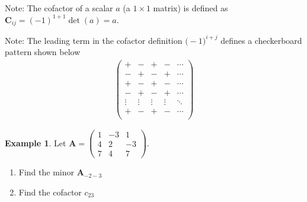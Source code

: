 \documentclass[
]{book}
\theoremstyle{definition}
\theoremstyle{definition}
\newtheorem{example}{Example}[chapter]
\theoremstyle{definition}
\theoremstyle{definition}
\theoremstyle{remark}
\begin{document}
Note: The cofactor of a scalar \(a\) (a \(1 \times 1\) matrix) is defined as \(\mathbf{C}_{ij} = (-1)^{1 + 1} \det(a) = a\).

Note: The leading term in the cofactor definition \(\mathbf(-1)^{i + j}\) defines a checkerboard pattern shown below
\[
\begin{aligned}
\begin{pmatrix}
+ & - & + & - & \cdots \\
- & + & - & + & \cdots \\
+ & - & + & - & \cdots \\
- & + & - & + & \cdots \\
\vdots & \vdots & \vdots & \vdots & \ddots \\
+ & - & + & - & \cdots \\
\end{pmatrix}
\end{aligned}
\]

\begin{example}

Let \(\mathbf{A} = \begin{pmatrix} 1 & -3 & 1 \\ 4 & 2 & -3 \\ 7 & 4 & 7 \end{pmatrix}\).

\begin{enumerate}
\def\labelenumi{\alph{enumi})}
\item
  Find the minor \(\mathbf{A}_{-2-3}\)
\item
  Find the cofactor \(c_{23}\)
\end{enumerate}

\end{example}
\end{document}
